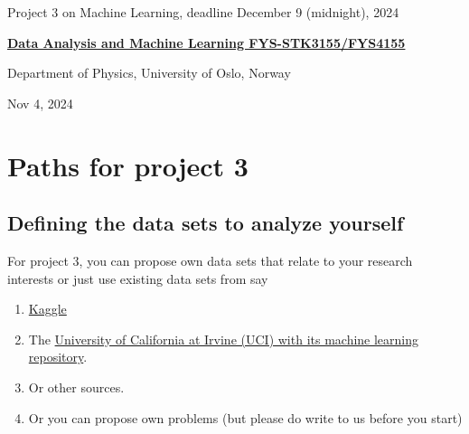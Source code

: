 \documentclass[%
oneside,                 %
final,                   %
10pt]{article}
\begin{document}

\newcommand{\exercisesection}[1]{\subsection*{#1}}






\thispagestyle{empty}

\begin{center}
{\LARGE\bf
\begin{spacing}{1.25}
Project 3 on Machine Learning, deadline December 9 (midnight), 2024
\end{spacing}
}
\end{center}


\begin{center}
{\bf \href{{http://www.uio.no/studier/emner/matnat/fys/FYS3155/index-eng.html}}{Data Analysis and Machine Learning FYS-STK3155/FYS4155}}
\end{center}

    \begin{center}
\centerline{{\small Department of Physics, University of Oslo, Norway}}
\end{center}
    

\begin{center}
Nov 4, 2024
\end{center}

\vspace{1cm}


\section{Paths for project 3}

\subsection{Defining the data sets to analyze yourself}

For project 3, you can propose own data sets that relate to your research interests or just use existing data sets from say
\begin{enumerate}
\item \href{{https://www.kaggle.com/datasets}}{Kaggle} 

\item The \href{{https://archive.ics.uci.edu/ml/index.php}}{University of California at Irvine (UCI) with its  machine learning repository}.

\item Or other sources.

\item Or you can propose own problems (but please do write to us before you start)
\end{enumerate}
\end{document}
